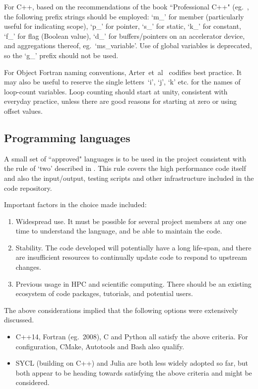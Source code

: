 \begin{enumerate}
For C++, based on the recommendations of the book ``Professional C++" (eg.\
\cite[\S\,7]{solterkleper}, the following prefix strings should be employed:
`m\_' for  member (particularly useful for indicating scope),
`p\_' for pointer, `s\_' for static, `k\_' for constant,
`f\_' for flag (Boolean value),
`d\_' for buffers/pointers on an accelerator device,
and aggregations thereof, eg.\ `ms\_variable'.
Use of global variables is deprecated, so the `g\_' prefix should not be used.

For Object Fortran naming conventions, Arter~et~al~\cite{fprog} codifies best practice.
It may also be useful to reserve the single letters~`i', `j', `k' etc. for the
names of loop-count variables. Loop counting should start at unity, consistent
with everyday practice, unless there are good reasons for starting at zero
or using offset values. %

\end{enumerate}

\subsection{Programming languages} \label{sec:lang}

A small set of ``approved" languages is to be used in the project
consistent with the rule of `two' described in \Sec{MGT_intro}.
This rule covers the high performance code itself and
also the input/output, testing scripts and other infrastructure included in
the code repository.

Important factors in the choice made included:
\begin{enumerate}
\item Widespread use. It must be possible for several project members at any one time
to understand the language, and be able to maintain the code.
\item Stability. The code developed will potentially have a long life-span, 
and there are insufficient resources to continually update code to respond to
upstream changes.
\item Previous usage in HPC and scientific computing. There should be an
existing ecosystem of code packages, tutorials, and potential users.
\end{enumerate}
The above considerations implied that the following options were extensively discussed.
\begin{itemize}
\item C++14, Fortran (eg.\ 2008), C and Python all satisfy the above criteria. 
For configuration, CMake, Autotools and Bash also qualify.
\item SYCL (building on C++) and Julia are both less widely adopted so
far, but both appear to be heading towards satisfying the above
criteria and  might be considered.
\end{itemize}


